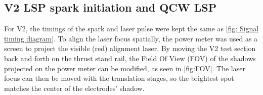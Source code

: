         \subsection{V2 LSP spark initiation and QCW LSP}

            For V2, the timings of the spark and laser pulse were kept the same as \autoref{fig: Signal timing diagram}. To align the laser focus spatially, the power meter was used as a screen to project the visible (red) alignment laser. By moving the V2 test section back and forth on the thrust stand rail, the Field Of View (FOV) of the shadows projected on the power meter can be modified, as seen in \autoref{fig:FOV}. The laser focus can then be moved with the translation stages, so the brightest spot matches the center of the electrodes' shadow.
            
